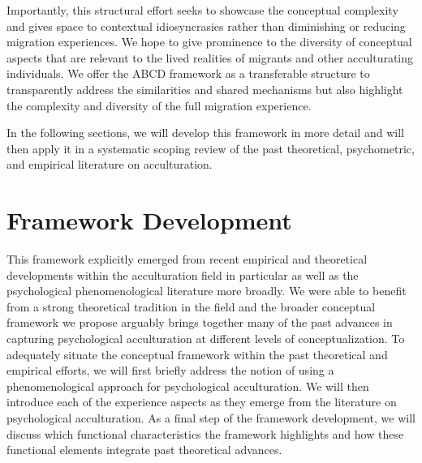 \documentclass[man, 12pt, a4paper, mask]{apa7}
\begin{document}
Importantly, this structural effort seeks to showcase the conceptual complexity and gives space to contextual idiosyncrasies rather than diminishing or reducing migration experiences. We hope to give prominence to the diversity of conceptual aspects that are relevant to the lived realities of migrants and other acculturating individuals. We offer the ABCD framework as a transferable structure to transparently address the similarities and shared mechanisms but also highlight the complexity and diversity of the full migration experience.

In the following sections, we will develop this framework in more detail and will then apply it in a systematic scoping review of the past theoretical, psychometric, and empirical literature on acculturation.



\section{Framework Development} 
This framework explicitly emerged from recent empirical and theoretical developments within the acculturation field in particular as well as the psychological phenomenological literature more broadly. We were able to benefit from a strong theoretical tradition in the field and the broader conceptual framework we propose arguably brings together many of the past advances in capturing psychological acculturation at different levels of conceptualization. To adequately situate the conceptual framework within the past theoretical and empirical efforts, we will first briefly address the notion of using a phenomenological approach for psychological acculturation. We will then introduce each of the experience aspects as they emerge from the literature on psychological acculturation. As a final step of the framework development, we will discuss which functional characteristics the framework highlights and how these functional elements integrate past theoretical advances.
\end{document}
